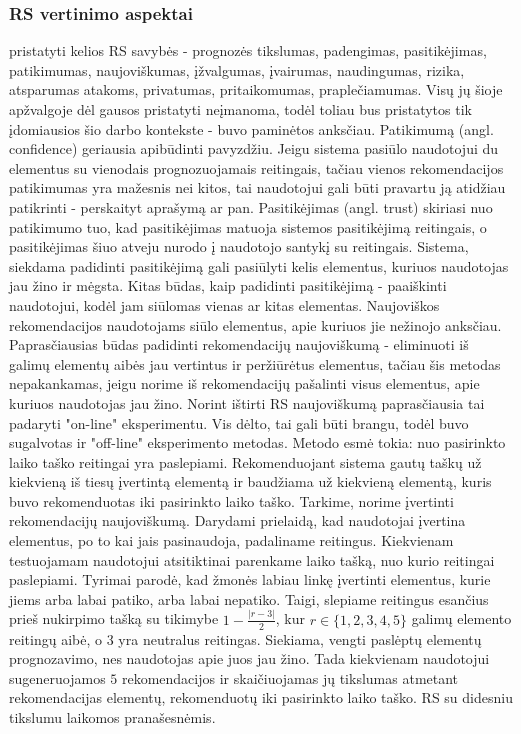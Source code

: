 \documentclass{VUMIFInfMagistrinis}
\begin{document}
\subsubsection{RS vertinimo aspektai}
\cite{3} pristatyti kelios RS savybės - prognozės tikslumas, padengimas, pasitikėjimas, patikimumas, naujoviškumas, įžvalgumas, įvairumas, naudingumas, rizika, atsparumas atakoms, privatumas, pritaikomumas, praplečiamumas. Visų jų šioje apžvalgoje dėl gausos pristatyti neįmanoma, todėl toliau bus pristatytos tik įdomiausios šio darbo kontekste - buvo paminėtos anksčiau.
Patikimumą (angl. confidence) geriausia apibūdinti pavyzdžiu. Jeigu sistema pasiūlo naudotojui du elementus su vienodais prognozuojamais reitingais, tačiau vienos rekomendacijos patikimumas yra mažesnis nei kitos, tai naudotojui gali būti pravartu ją atidžiau patikrinti - perskaityt aprašymą ar pan. 
Pasitikėjimas (angl. trust) skiriasi nuo patikimumo tuo, kad pasitikėjimas matuoja sistemos pasitikėjimą reitingais, o pasitikėjimas šiuo atveju nurodo į naudotojo santykį su reitingais. Sistema, siekdama padidinti pasitikėjimą gali pasiūlyti kelis elementus, kuriuos naudotojas jau žino ir mėgsta. Kitas būdas, kaip padidinti pasitikėjimą - paaiškinti naudotojui, kodėl jam siūlomas vienas ar kitas elementas.
Naujoviškos rekomendacijos naudotojams siūlo elementus, apie kuriuos jie nežinojo anksčiau. Paprasčiausias būdas padidinti rekomendacijų naujoviškumą - eliminuoti iš galimų elementų aibės jau vertintus ir peržiūrėtus elementus, tačiau šis metodas nepakankamas, jeigu norime iš rekomendacijų pašalinti visus elementus, apie kuriuos naudotojas jau žino.
\newline
\indent
Norint ištirti RS naujoviškumą paprasčiausia tai padaryti "on-line" eksperimentu. Vis dėlto, tai gali būti brangu, todėl buvo sugalvotas ir "off-line" eksperimento metodas. Metodo esmė tokia: nuo pasirinkto laiko taško reitingai yra paslepiami. Rekomenduojant sistema gautų taškų už kiekvieną iš tiesų įvertintą elementą ir baudžiama už kiekvieną elementą, kuris buvo rekomenduotas iki pasirinkto laiko taško.
\newline
\indent
Tarkime, norime įvertinti rekomendacijų naujoviškumą. Darydami prielaidą, kad naudotojai įvertina elementus, po to kai jais pasinaudoja, padaliname reitingus. Kiekvienam testuojamam naudotojui atsitiktinai parenkame laiko tašką, nuo kurio reitingai paslepiami. Tyrimai parodė, kad žmonės labiau linkę įvertinti elementus, kurie jiems arba labai patiko, arba labai nepatiko. Taigi, slepiame reitingus esančius prieš nukirpimo tašką su tikimybe $1-\frac{|r-3|}{2}$, kur $r \in \{1,2,3,4,5\}$ galimų elemento reitingų aibė, o $3$ yra neutralus reitingas. Siekiama, vengti paslėptų elementų prognozavimo, nes naudotojas apie juos jau žino. Tada kiekvienam naudotojui sugeneruojamos $5$ rekomendacijos ir skaičiuojamas jų tikslumas atmetant rekomendacijas elementų, rekomenduotų iki pasirinkto laiko taško. RS su didesniu tikslumu laikomos pranašesnėmis.
\end{document}
